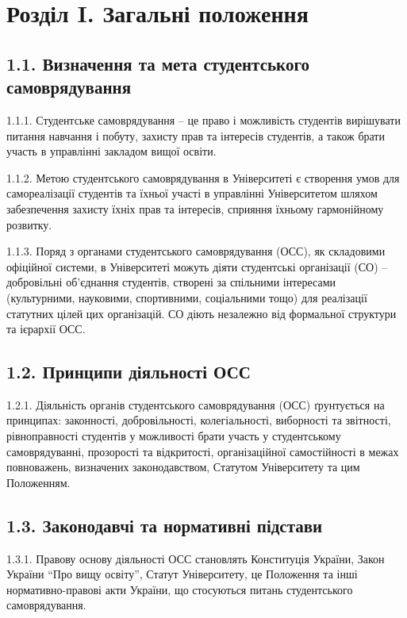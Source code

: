 \section*{Розділ I. Загальні положення}

\subsection*{1.1. Визначення та мета студентського самоврядування}
    1.1.1. Студентське самоврядування -- це право і можливість студентів вирішувати питання навчання і побуту, захисту прав та інтересів студентів, а також брати участь в управлінні закладом вищої освіти.

    1.1.2. Метою студентського самоврядування в Університеті є створення умов для самореалізації студентів та їхньої участі в управлінні Університетом шляхом забезпечення захисту їхніх прав та інтересів, сприяння їхньому гармонійному розвитку.

    1.1.3. Поряд з органами студентського самоврядування (ОСС), як складовими офіційної системи, в Університеті можуть діяти студентські організації (СО) – добровільні об'єднання студентів, створені за спільними інтересами (культурними, науковими, спортивними, соціальними тощо) для реалізації статутних цілей цих організацій. СО діють незалежно від формальної структури та ієрархії ОСС.

\subsection*{1.2. Принципи діяльності ОСС}
    1.2.1. Діяльність органів студентського самоврядування (ОСС) ґрунтується на принципах: законності, добровільності, колегіальності, виборності та звітності, рівноправності студентів у можливості брати участь у студентському самоврядуванні, прозорості та відкритості, організаційної самостійності в межах повноважень, визначених законодавством, Статутом Університету та цим Положенням.

\subsection*{1.3. Законодавчі та нормативні підстави}
    1.3.1. Правову основу діяльності ОСС становлять Конституція України, Закон України ``Про вищу освіту'', Статут Університету, це Положення та інші нормативно-правові акти України, що стосуються питань студентського самоврядування.

